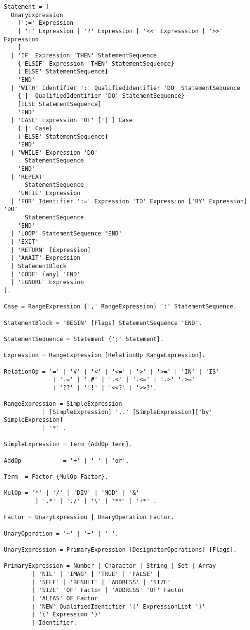 \documentclass[a4wide,11pt]{article}
\begin{document}
\begin{lstlisting}[style=EBNF]
Statement = [
  UnaryExpression
    [':=' Expression
    | '!' Expression | '?' Expression | '<<' Expresssion | '>>' Expression
    ]
  | 'IF' Expression 'THEN' StatementSequence
    {'ELSIF' Expression 'THEN' StatementSequence}
    ['ELSE' StatementSequence]
    'END'
  | 'WITH' Identifier ':' QualifiedIdentifier 'DO' StatementSequence
    {'|' QualifiedIdentifier 'DO' StatementSequence}
    [ELSE StatementSequence]
    'END'
  | 'CASE' Expression 'OF' ['|'] Case
    {'|' Case}
    ['ELSE' StatementSequence]
    'END'
  | 'WHILE' Expression 'DO'
      StatementSequence
    'END'
  | 'REPEAT'
      StatementSequence
    'UNTIL' Expression
  | 'FOR' Identifier ':=' Expression 'TO' Expression ['BY' Expression] 'DO'
      StatementSequence
    'END'
  | 'LOOP' StatementSequence 'END'
  | 'EXIT'
  | 'RETURN' [Expression]
  | 'AWAIT' Expression
  | StatementBlock
  | 'CODE' {any} 'END'
  | 'IGNORE' Expression
].

Case = RangeExpression {',' RangeExpression} ':' StatementSequence.

StatementBlock = 'BEGIN' [Flags] StatementSequence 'END'.

StatementSequence = Statement {';' Statement}.

Expression = RangeExpression [RelationOp RangeExpression].

RelationOp = '=' | '#' | '<' | '<=' | '>' | '>=' | 'IN' | 'IS'
              | '.=' | '.#' | '.<' | '.<=' | '.>' '.>='
              | '??' | '!!' | '<<?' | '>>?'.

RangeExpression = SimpleExpression
           | [SimpleExpression] '..' [SimpleExpression]['by' SimpleExpression]
           | '*' .

SimpleExpression = Term {AddOp Term}.

AddOp            = '+' | '-' | 'or'.

Term  = Factor {MulOp Factor}.

MulOp = '*' | '/' | 'DIV' | 'MOD' | '&'
         | '.*' | './' | '\' | '**' | '+*' .

Factor = UnaryExpression | UnaryOperation Factor.

UnaryOperation = '~' | '+' | '-'.

UnaryExpression = PrimaryExpression [DesignatorOperations] [Flags].

PrimaryExpression = Number | Character | String | Set | Array
        | 'NIL' | 'IMAG' | 'TRUE' | 'FALSE' |
        | 'SELF' | 'RESULT' | 'ADDRESS' | 'SIZE'
        | 'SIZE' 'OF' Factor | 'ADDRESS' 'OF' Factor
        | 'ALIAS' OF Factor
        | 'NEW' QualifiedIdentifier '(' ExpressionList ')'
        | '(' Expression ')'
        | Identifier.


\end{lstlisting}
\end{document}
